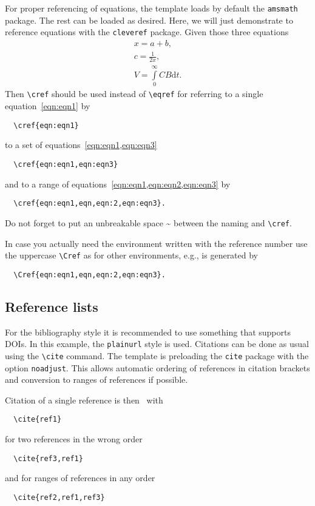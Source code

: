 \documentclass[%
  a4paper,
  twocolumn,
  algotwoe,
]{preprint}
\begin{document}
For proper referencing of equations, the template loads by default the
\verb|amsmath| package.
The rest can be loaded as desired.
Here, we will just demonstrate to reference equations with the \verb|cleveref|
package.
Given those three equations
\begin{align}
  \label{eqn:eqn1}
  x = a + b,\\
  \label{eqn:eqn2}
  c = \frac{1}{2 x},\\
  \label{eqn:eqn3}
  V = \int\limits_{0}^{\infty} CB \mathrm{d}t.
\end{align}
Then \verb|\cref| should be used instead of \verb|\eqref| for referring to
a single equation~\cref{eqn:eqn1} by
\begin{verbatim}
  \cref{eqn:eqn1}
\end{verbatim}
to a set of equations~\cref{eqn:eqn1,eqn:eqn3}
\begin{verbatim}
  \cref{eqn:eqn1,eqn:eqn3}
\end{verbatim}
and to a range of equations~\cref{eqn:eqn1,eqn:eqn2,eqn:eqn3} by
\begin{verbatim}
  \cref{eqn:eqn1,eqn,eqn:2,eqn:eqn3}.
\end{verbatim}
Do not forget to put an unbreakable space \~{} between the naming and
\verb|\cref|.

In case you actually need the environment written with the reference number
use the uppercase \verb|\Cref| as for other environments, e.g.,
 is generated by
\begin{verbatim}
  \Cref{eqn:eqn1,eqn,eqn:2,eqn:eqn3}.
\end{verbatim}


\subsection{Reference lists}%
\label{subsec:ref}

For the bibliography style it is recommended to use something that supports
DOIs.
In this example, the \verb|plainurl| style is used.
Citations can be done as usual using the \verb|\cite| command.
The template is preloading the \verb|cite| package with the option
\verb|noadjust|.
This allows automatic ordering of references in citation brackets and conversion
to ranges of references if possible.

Citation of a single reference is then~\cite{ref1} with
\begin{verbatim}
  \cite{ref1}
\end{verbatim}
for two references in the wrong order~\cite{ref3, ref1}
\begin{verbatim}
  \cite{ref3,ref1}
\end{verbatim}
and for ranges of references in any order~\cite{ref2, ref1, ref3}
\begin{verbatim}
  \cite{ref2,ref1,ref3}
\end{verbatim}
\end{document}
